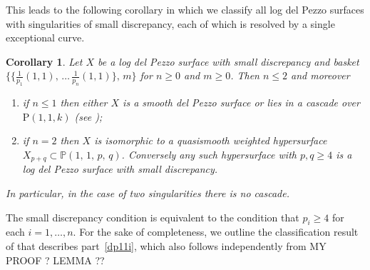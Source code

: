\documentclass[11pt]{amsbook}
\theoremstyle{plain}
\newtheorem{cor}[thm]{Corollary}
\newcommand{\mb}[1]{\mathbb{#1}}
\renewcommand{\P}{\mathrm{P}}
\begin{document}
This leads to the following corollary in which we classify all log del Pezzo surfaces with singularities of small discrepancy, each of which is resolved by a single exceptional curve.
 
\begin{cor}
Let $X$ be a log del Pezzo surface with small discrepancy and
basket  $\{ \{ \frac{1}{p_1}(1,1), \, \dots \, \frac{1}{p_n}(1,1) \}, \, m \}$
for $n\ge0$ and $m\ge0$. Then $n\le2$ and moreover
\begin{enumerate}
\item\label{dp11i}
if $n\le1$ then either $X$ is a smooth del Pezzo surface or 
lies in a cascade over $\P(1,1,k)$ (see \cite[Table ??]{CP});
\item\label{dp11ii}
if $n=2$ then $X$
is isomorphic to a quasismooth weighted hypersurface
$X_{p+q}\subset \mb{P}(1,\,1,\,p,\,q)$. Conversely any such hypersurface with $p,q\ge4$ is
a log del Pezzo surface with small discrepancy.
\end{enumerate}
In particular, in the case of two singularities there is no cascade.
\end{cor}

The small discrepancy condition is equivalent to the condition that
$p_i \geq 4$ for each $i=1,\dots,n$. 
For the sake of completeness, we outline the classification result of \cite{CP} that
describes part~\ref{dp11i}, which also follows independently from MY PROOF ? LEMMA ??
\end{document}
